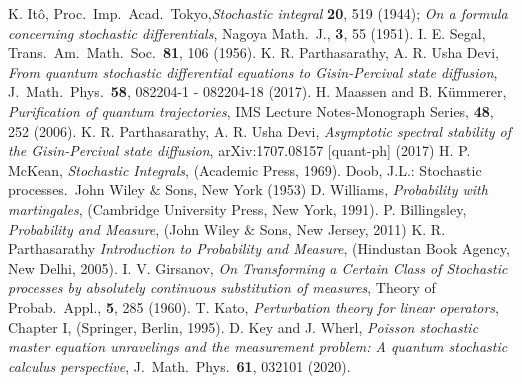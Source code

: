 \begin{thebibliography}{99}
	 K. It\^{o}, Proc.\ Imp.\ Acad.\ Tokyo,{\em Stochastic integral} {\bf 20}, 519 (1944); {\em On a formula concerning stochastic differentials}, Nagoya Math.\ J., {\bf 3}, 55 (1951).
	 I. E. Segal, Trans.\ Am.\ Math.\ Soc.\ {\bf 81}, 106 (1956). 
	 K. R. Parthasarathy, A. R.  Usha Devi, {\em From quantum stochastic differential equations to Gisin-Percival state diffusion}, J.\ Math.\ Phys.\ {\bf 58},  082204-1 - 082204-18   (2017).      
	 H. Maassen and B. K{\"u}mmerer, {\em Purification of quantum trajectories}, IMS Lecture Notes-Monograph Series, {\bf 48}, 252 (2006). 
	 K. R. Parthasarathy, A. R.  Usha Devi, {\em Asymptotic spectral stability of the Gisin-Percival state diffusion},  arXiv:1707.08157 [quant-ph] (2017)
	 H. P. McKean, {\em Stochastic Integrals}, (Academic Press, 1969).
	 Doob, J.L.:  Stochastic processes.\ John Wiley $\&$ Sons, New York (1953)
	  D. Williams,  {\em Probability with martingales},  (Cambridge University Press, New York, 1991). 
	 P. Billingsley, {\em  Probability and Measure}, (John Wiley $\&$ Sons, New Jersey, 2011) 
	 K. R. Parthasarathy {\em  Introduction to Probability and Measure}, (Hindustan Book Agency, New Delhi, 2005).  
	 I. V. Girsanov, {\em On Transforming a Certain Class of Stochastic processes by absolutely continuous substitution of measures}, Theory of Probab.\ Appl., {\bf 5}, 285 (1960). 
	  T. Kato, {\em  Perturbation theory for linear operators}, Chapter I,  (Springer, Berlin, 1995).
	 D. Key and J. Wherl, {\em Poisson stochastic master equation unravelings and the measurement problem: A quantum stochastic calculus perspective}, J.\ Math.\ Phys.\ {\bf 61}, 032101 (2020). 
\end{thebibliography}
\bigskip

